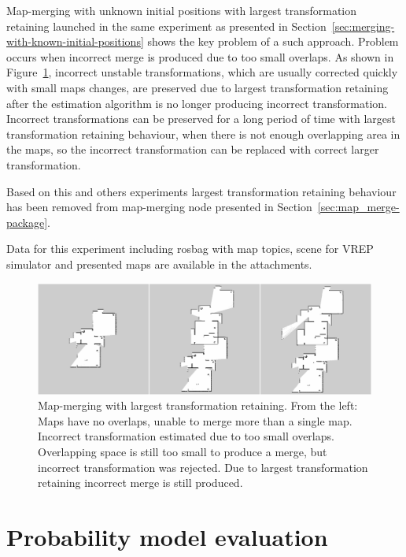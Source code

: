 Map-merging with unknown initial positions with largest transformation retaining launched in the same experiment as presented in Section~\ref{sec:merging-with-known-initial-positions} shows the key problem of a such approach. Problem occurs when incorrect merge is produced due to too small overlaps. As shown in Figure~\ref{fig:retaining-largest-transformation-montage}, incorrect unstable transformations, which are usually corrected quickly with small maps changes, are preserved due to largest transformation retaining after the estimation algorithm is no longer producing incorrect transformation. Incorrect transformations can be preserved for a long period of time with largest transformation retaining behaviour, when there is not enough overlapping area in the maps, so the incorrect transformation can be replaced with correct larger transformation.

Based on this and others experiments largest transformation retaining behaviour has been removed from map-merging node presented in Section~\ref{sec:map_merge-package}.

Data for this experiment including rosbag with map topics, scene for \gls{VREP} simulator and presented maps are available in the attachments.

\begin{figure}
    \centering
    \includegraphics[width=5.71in]{../img/retaining-largest-transformation-montage.png}
    \caption[Map-merging with largest transformation retaining.]{Map-merging with largest transformation retaining. From the left: Maps have no overlaps, unable to merge more than a single map. Incorrect transformation estimated due to too small overlaps. Overlapping space is still too small to produce a merge, but incorrect transformation was rejected. Due to largest transformation retaining incorrect merge is still produced.}
    \label{fig:retaining-largest-transformation-montage}
\end{figure}

\section{Probability model evaluation}
\label{sec:probability-model-evaluation}

